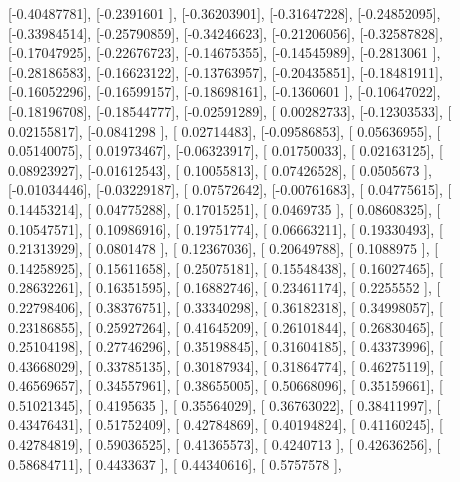 \documentclass{article}
\begin{document}
       [-0.40487781],
       [-0.2391601 ],
       [-0.36203901],
       [-0.31647228],
       [-0.24852095],
       [-0.33984514],
       [-0.25790859],
       [-0.34246623],
       [-0.21206056],
       [-0.32587828],
       [-0.17047925],
       [-0.22676723],
       [-0.14675355],
       [-0.14545989],
       [-0.2813061 ],
       [-0.28186583],
       [-0.16623122],
       [-0.13763957],
       [-0.20435851],
       [-0.18481911],
       [-0.16052296],
       [-0.16599157],
       [-0.18698161],
       [-0.1360601 ],
       [-0.10647022],
       [-0.18196708],
       [-0.18544777],
       [-0.02591289],
       [ 0.00282733],
       [-0.12303533],
       [ 0.02155817],
       [-0.0841298 ],
       [ 0.02714483],
       [-0.09586853],
       [ 0.05636955],
       [ 0.05140075],
       [ 0.01973467],
       [-0.06323917],
       [ 0.01750033],
       [ 0.02163125],
       [ 0.08923927],
       [-0.01612543],
       [ 0.10055813],
       [ 0.07426528],
       [ 0.0505673 ],
       [-0.01034446],
       [-0.03229187],
       [ 0.07572642],
       [-0.00761683],
       [ 0.04775615],
       [ 0.14453214],
       [ 0.04775288],
       [ 0.17015251],
       [ 0.0469735 ],
       [ 0.08608325],
       [ 0.10547571],
       [ 0.10986916],
       [ 0.19751774],
       [ 0.06663211],
       [ 0.19330493],
       [ 0.21313929],
       [ 0.0801478 ],
       [ 0.12367036],
       [ 0.20649788],
       [ 0.1088975 ],
       [ 0.14258925],
       [ 0.15611658],
       [ 0.25075181],
       [ 0.15548438],
       [ 0.16027465],
       [ 0.28632261],
       [ 0.16351595],
       [ 0.16882746],
       [ 0.23461174],
       [ 0.2255552 ],
       [ 0.22798406],
       [ 0.38376751],
       [ 0.33340298],
       [ 0.36182318],
       [ 0.34998057],
       [ 0.23186855],
       [ 0.25927264],
       [ 0.41645209],
       [ 0.26101844],
       [ 0.26830465],
       [ 0.25104198],
       [ 0.27746296],
       [ 0.35198845],
       [ 0.31604185],
       [ 0.43373996],
       [ 0.43668029],
       [ 0.33785135],
       [ 0.30187934],
       [ 0.31864774],
       [ 0.46275119],
       [ 0.46569657],
       [ 0.34557961],
       [ 0.38655005],
       [ 0.50668096],
       [ 0.35159661],
       [ 0.51021345],
       [ 0.4195635 ],
       [ 0.35564029],
       [ 0.36763022],
       [ 0.38411997],
       [ 0.43476431],
       [ 0.51752409],
       [ 0.42784869],
       [ 0.40194824],
       [ 0.41160245],
       [ 0.42784819],
       [ 0.59036525],
       [ 0.41365573],
       [ 0.4240713 ],
       [ 0.42636256],
       [ 0.58684711],
       [ 0.4433637 ],
       [ 0.44340616],
       [ 0.5757578 ],
\end{document}
